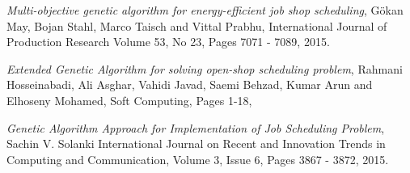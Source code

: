 \documentclass[a4paper, 12pt, titlepage]{article}
\begin{document}
\begin{thebibliography}{10}
  \textit{Multi-objective genetic algorithm for energy-efficient job shop scheduling},
  Gökan May, Bojan Stahl, Marco Taisch and Vittal Prabhu,
  International Journal of Production Research
  Volume 53,
  No 23, 
  Pages  7071 - 7089,
  2015.

  \textit{Extended Genetic Algorithm for solving open-shop scheduling problem},
  Rahmani Hosseinabadi, Ali Asghar, Vahidi Javad, Saemi Behzad, Kumar Arun and Elhoseny Mohamed,
  Soft Computing,
  Pages 1-18, 

  \textit{Genetic Algorithm Approach for Implementation of Job Scheduling Problem},
  Sachin V. Solanki
  International Journal on Recent and Innovation Trends in Computing and Communication,
  Volume 3,
  Issue 6,
  Pages 3867 - 3872,
  2015.
  
\end{thebibliography}
\end{document}
